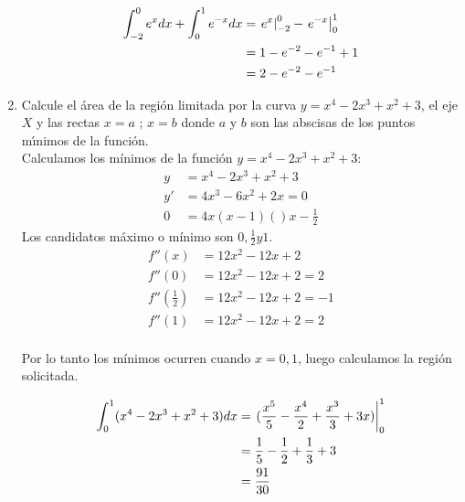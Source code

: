 \documentclass[letterpaper,10pt]{article}
\newcommand{\dis}{\displaystyle}
\begin{document}
\begin{enumerate}
\begin{figure}[!htb]
\begin{minipage}{0.6\textwidth}
   \end{minipage}
   \begin {minipage}{0.3\textwidth}
     
   \end{minipage}
\end{figure}

\begin{align*}
\dis \int_{-2}^0 e^{x}dx + \int_{0}^1 e^{-x}dx &= \displaystyle   \left.e^{x}\right|_{-2}^{0} - \left.e^{-x}\right|_{0}^{1}\\
\dis  &= 1 - e^{-2}-e^{-1}+1\\
\dis  &= 2 - e^{-2}-e^{-1}
\end{align*}


\newpage
\item Calcule el \'{a}rea de la regi\'{o}n limitada por la curva
$y=x^4-2x^3+x^2+3$, el eje $X$ y las rectas $x=a$ ; $x=b$ donde  $a$
y $b$ son las abscisas de los puntos m\'{\i}nimos de la funci\'{o}n.\\

Calculamos los mínimos de la función  $y=x^4-2x^3+x^2+3$:\\
\begin{align*}
\dis y &= x^4-2x^3+x^2+3\\
\dis y' &= 4x^3- 6x^2+2x =0\\
\dis  0&= 4x(x-1)()x-\frac{1}{2}
\end{align*}
Los candidatos máximo o mínimo son ${0,\frac{1}{2} y 1}$.
\begin{align*}
\dis f''(x) &=12x^2-12x+2\\
\dis f''(0) &=12x^2-12x+2 = 2\\
\dis  f''(\frac{1}{2}) &=12x^2-12x+2 = -1\\
\dis  f''(1) &=12x^2-12x+2 = 2\\
\end{align*}

Por lo tanto los mínimos ocurren cuando $x ={0,1}$, luego calculamos la región solicitada.

\begin{align*}
\dis \int_{0}^1 (x^4-2x^3+x^2+3)dx &= \displaystyle   \left.(\frac{x^5}{5}- \frac{x^4}{2} + \frac{x^3}{3} + 3x)\right|_{0}^{1}\\
\dis  &= \frac{1}{5} - \frac{1}{2} + \frac{1}{3} + 3\\
\dis  &= \frac{91}{30}
\end{align*}




\end{enumerate}
\end{document}
